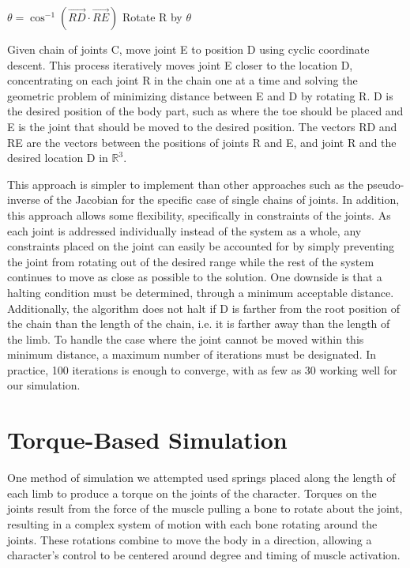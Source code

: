 \begin{algorithm}[ht]
	\centering
	\begin{algorithmic}[H]
		\Repeat
			\State $\theta = \cos^{-1} \left(\vec{RD} \cdot \vec{RE}\right)$
			\State Rotate R by $\theta$
		\EndFor
		\EndFunction
	\end{algorithmic}
	\caption[Single chain IK algorithm]{Given chain of joints C, move joint E to position D using cyclic coordinate descent.  This process iteratively moves joint E closer to the location D, concentrating on each joint R in the chain one at a time and solving the geometric problem of minimizing distance between E and D by rotating R.  D is the desired position of the body part, such as where the toe should be placed and E is the joint that should be moved to the desired position.  The vectors RD and RE are the vectors between the positions of joints R and E, and joint R and the desired location D in $\mathbb{R}^3$.}
	\label{alg:ik}
\end{algorithm}


This approach is simpler to implement than other approaches such as the pseudo-inverse of the Jacobian for the specific case of single chains of joints.  In addition, this approach allows some flexibility, specifically in constraints of the joints.  As each joint is addressed individually instead of the system as a whole, any constraints placed on the joint can easily be accounted for by simply preventing the joint from rotating out of the desired range while the rest of the system continues to move as close as possible to the solution.  One downside is that a halting condition must be determined, through a minimum acceptable distance.  Additionally, the algorithm does not halt if D is farther from the root position of the chain than the length of the chain, i.e. it is farther away than the length of the limb.  To handle the case where the joint cannot be moved within this minimum distance, a maximum number of iterations must be designated.  In practice, 100 iterations is enough to converge, with as few as 30 working well for our simulation.

\section{Torque-Based Simulation}
\label{section:torque}
One method of simulation we attempted used springs placed along the length of each limb to produce a torque on the joints of the character.  Torques on the joints result from the force of the muscle pulling a bone to rotate about the joint, resulting in a complex system of motion with each bone rotating around the joints.  These rotations combine to move the body in a direction, allowing a character's control to be centered around degree and timing of muscle activation. 

